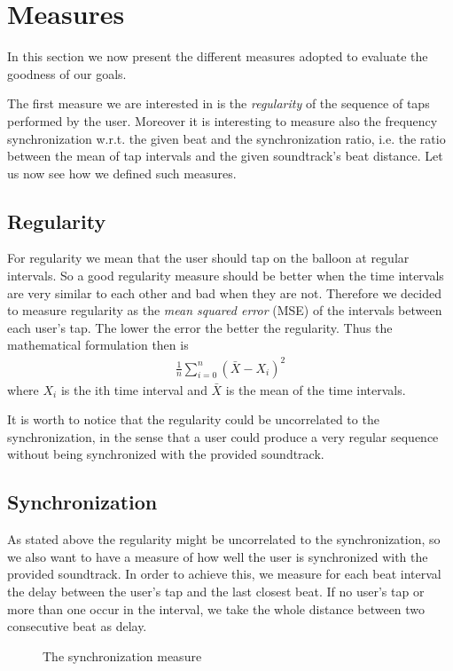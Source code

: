\section{Measures}
\label{sec:measures}
In this section we now present the different measures adopted to evaluate the goodness of our goals.

The first measure we are interested in is the \emph{regularity} of the sequence of taps performed by the user. Moreover it is interesting to measure also the frequency synchronization w.r.t. the given beat and the synchronization ratio, i.e. the ratio between the mean of tap intervals and the given soundtrack's beat distance.
Let us now see how we defined such measures.
\subsection{Regularity}
For regularity we mean that the user should tap on the balloon at regular intervals. So a good regularity measure should be better when the time intervals are very similar to each other and bad when they are not. Therefore we decided to measure regularity as the \emph{mean squared error} (MSE) of the intervals between each user's tap.
The lower the error the better the regularity.
Thus the mathematical formulation then is
\begin{align}
	\frac{1}{n}\displaystyle\sum\limits_{i=0}^n(\bar{X}-X_i)^2
\end{align}
where $X_i$ is the ith time interval and $\bar{X}$ is the mean of the time intervals.

It is worth to notice that the regularity could be uncorrelated to the synchronization, in the sense that a user could produce a very regular sequence without being synchronized with the provided soundtrack.

\subsection{Synchronization}
As stated above the regularity might be uncorrelated to the synchronization, so we also want to have a measure of how well the user is synchronized with the provided soundtrack.
In order to achieve this, we measure for each beat interval the delay between the user's tap and the last closest beat.
If no user's tap or more than one occur in the interval, we take the whole distance between two consecutive beat as delay.

\begin{figure}[h!t]
\label{fig:sync-measure}
\centering
	{\setlength{\fboxsep}{1.5pt}
	 }
\caption{The synchronization measure}
\end{figure}

